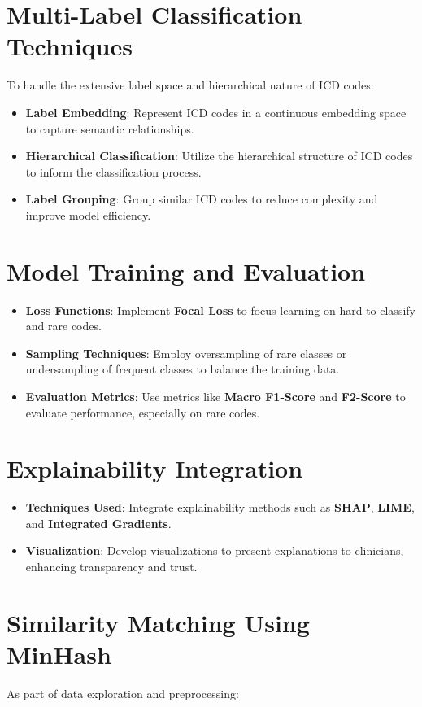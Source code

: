 \documentclass[12pt,a4paper]{report}
\begin{document}
\section{Multi-Label Classification Techniques}
To handle the extensive label space and hierarchical nature of ICD codes:

\begin{itemize}
    \item \textbf{Label Embedding}: Represent ICD codes in a continuous embedding space to capture semantic relationships.
    \item \textbf{Hierarchical Classification}: Utilize the hierarchical structure of ICD codes to inform the classification process.
    \item \textbf{Label Grouping}: Group similar ICD codes to reduce complexity and improve model efficiency.
\end{itemize}

\section{Model Training and Evaluation}
\begin{itemize}
    \item \textbf{Loss Functions}: Implement \textbf{Focal Loss} to focus learning on hard-to-classify and rare codes.
    \item \textbf{Sampling Techniques}: Employ oversampling of rare classes or undersampling of frequent classes to balance the training data.
    \item \textbf{Evaluation Metrics}: Use metrics like \textbf{Macro F1-Score} and \textbf{F2-Score} to evaluate performance, especially on rare codes.
\end{itemize}

\section{Explainability Integration}
\begin{itemize}
    \item \textbf{Techniques Used}: Integrate explainability methods such as \textbf{SHAP}, \textbf{LIME}, and \textbf{Integrated Gradients}.
    \item \textbf{Visualization}: Develop visualizations to present explanations to clinicians, enhancing transparency and trust.
\end{itemize}

\section{Similarity Matching Using MinHash}
As part of data exploration and preprocessing:
\end{document}
